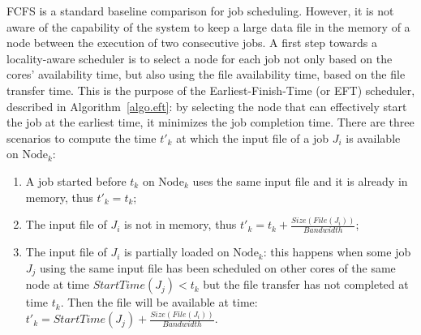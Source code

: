 \documentclass[sigconf,review,anonymous]{acmart}
\newcommand{\Node}[1]{\ensuremath{\mathrm{Node}_{#1}}\xspace}
\newcommand{\file}{\ensuremath{\mathit{File}}\xspace}
\newcommand{\size}{\ensuremath{\mathit{Size}}\xspace}
\newcommand{\bandwidth}{\mathit{Bandwidth}\xspace}
\newcommand{\start}{\mathit{StartTime}\xspace}
\begin{document}
FCFS is a standard baseline comparison
for job scheduling. However, it is not aware of the capability of the
system to keep a large data file in the memory of a node between the execution of
two consecutive jobs.
A first step towards a locality-aware scheduler
is to select a node for each job not only based on the cores' availability
time, but also using the file availability time, based on the file
transfer time. This is the purpose of the Earliest-Finish-Time (or
EFT) scheduler, described in Algorithm~\ref{algo.eft}: by selecting
the node that can effectively start the job at the earliest time, it
minimizes the job completion time. There are three scenarios to compute the
time $t'_k$ at which the input file of a job $J_i$ is available on
\Node{k}:
\begin{enumerate}
\item A job started before $t_k$ on \Node{k} uses the same input
  file and it is already in memory, thus $t'_k=t_k$;
\item The input file of $J_i$ is not in memory, thus
  $t'_k=t_k+\frac{\size(\file(J_i))}{\bandwidth}$;
\item The input file of $J_i$ is partially loaded on \Node{k}: this
  happens when some
  job $J_j$ using the same input file has been scheduled on other cores of
  the same node at time $\start(J_j)<t_k$ but the file transfer has not
  completed at time $t_k$. Then the file will be available at time:
  $t'_k = \start(J_j)+\frac{\size(\file(J_i))}{\bandwidth}.$
\end{enumerate}


		
\end{document}
